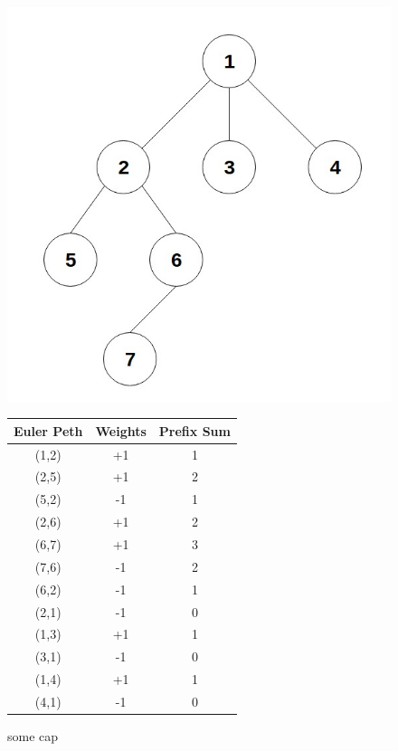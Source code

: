 \documentclass[twoside]{article}
\begin{document}
\begin{figure}[!h]
\centering
\begin{minipage}{.5\textwidth}
  \centering
  \includegraphics[scale=.3]{g3}
  \caption{Tree rooted at 1} 
  \label{fig:test1}
\end{minipage}%
\centering
\begin{minipage}{.5\textwidth}
  \centering
  \begin{center}
  \begin{tabular}{||c c c||} 
  \hline
     Euler Peth & Weights & Prefix Sum \\
  \hline
     (1,2) & {+1} & {1} \\
  \hline
  	 (2,5) & {+1} & {2} \\
  \hline
 	 (5,2) & {-1} & {1} \\
  \hline
 	 (2,6) & {+1} & {2} \\
  \hline
 	 (6,7) & {+1} & {3} \\
  \hline
 	 (7,6) & {-1} & {2} \\
  \hline
 	 (6,2) & {-1} & {1} \\
  \hline
 	 (2,1) & {-1} & {0} \\
  \hline
 	 (1,3) & {+1} & {1} \\
  \hline
 	 (3,1) & {-1} & {0} \\
  \hline
 	 (1,4) & {+1} & {1} \\
  \hline
 	 (4,1) & {-1} & {0} \\
  \hline
  \end{tabular}
  \end{center}
  \caption{some cap}
\label{fig:test1}
\end{minipage}%
\end{figure}
\end{document}
